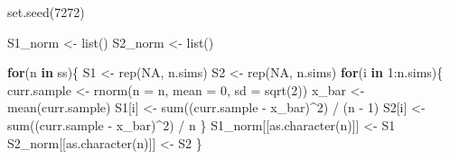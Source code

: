 \documentclass[
]{article}
\newenvironment{Shaded}{\begin{snugshade}}{\end{snugshade}}
\newcommand{\AttributeTok}[1]{\textcolor[rgb]{0.40,0.45,0.13}{#1}}
\newcommand{\ConstantTok}[1]{\textcolor[rgb]{0.56,0.35,0.01}{#1}}
\newcommand{\ControlFlowTok}[1]{\textcolor[rgb]{0.00,0.23,0.31}{\textbf{#1}}}
\newcommand{\DecValTok}[1]{\textcolor[rgb]{0.68,0.00,0.00}{#1}}
\newcommand{\FunctionTok}[1]{\textcolor[rgb]{0.28,0.35,0.67}{#1}}
\newcommand{\NormalTok}[1]{\textcolor[rgb]{0.00,0.23,0.31}{#1}}
\newcommand{\OtherTok}[1]{\textcolor[rgb]{0.00,0.23,0.31}{#1}}
\newcommand{\SpecialCharTok}[1]{\textcolor[rgb]{0.37,0.37,0.37}{#1}}
\begin{document}
\begin{Shaded}
\begin{Highlighting}[numbers=left,,]
\FunctionTok{set.seed}\NormalTok{(}\DecValTok{7272}\NormalTok{)}

\NormalTok{S1\_norm }\OtherTok{\textless{}{-}} \FunctionTok{list}\NormalTok{()}
\NormalTok{S2\_norm }\OtherTok{\textless{}{-}} \FunctionTok{list}\NormalTok{()}

\ControlFlowTok{for}\NormalTok{(n }\ControlFlowTok{in}\NormalTok{ ss)\{}
\NormalTok{  S1 }\OtherTok{\textless{}{-}} \FunctionTok{rep}\NormalTok{(}\ConstantTok{NA}\NormalTok{, n.sims)}
\NormalTok{  S2 }\OtherTok{\textless{}{-}} \FunctionTok{rep}\NormalTok{(}\ConstantTok{NA}\NormalTok{, n.sims)}
  \ControlFlowTok{for}\NormalTok{(i }\ControlFlowTok{in} \DecValTok{1}\SpecialCharTok{:}\NormalTok{n.sims)\{}
\NormalTok{    curr.sample }\OtherTok{\textless{}{-}} \FunctionTok{rnorm}\NormalTok{(}\AttributeTok{n =}\NormalTok{ n, }\AttributeTok{mean =} \DecValTok{0}\NormalTok{, }\AttributeTok{sd =} \FunctionTok{sqrt}\NormalTok{(}\DecValTok{2}\NormalTok{))}
\NormalTok{    x\_bar }\OtherTok{\textless{}{-}} \FunctionTok{mean}\NormalTok{(curr.sample)}
\NormalTok{    S1[i] }\OtherTok{\textless{}{-}} \FunctionTok{sum}\NormalTok{((curr.sample }\SpecialCharTok{{-}}\NormalTok{ x\_bar)}\SpecialCharTok{\^{}}\DecValTok{2}\NormalTok{) }\SpecialCharTok{/}\NormalTok{ (n }\SpecialCharTok{{-}} \DecValTok{1}\NormalTok{)}
\NormalTok{    S2[i] }\OtherTok{\textless{}{-}} \FunctionTok{sum}\NormalTok{((curr.sample }\SpecialCharTok{{-}}\NormalTok{ x\_bar)}\SpecialCharTok{\^{}}\DecValTok{2}\NormalTok{) }\SpecialCharTok{/}\NormalTok{ n}
\NormalTok{  \}}
\NormalTok{  S1\_norm[[}\FunctionTok{as.character}\NormalTok{(n)]] }\OtherTok{\textless{}{-}}\NormalTok{ S1}
\NormalTok{  S2\_norm[[}\FunctionTok{as.character}\NormalTok{(n)]] }\OtherTok{\textless{}{-}}\NormalTok{ S2}
\NormalTok{\}}


\end{Highlighting}
\end{Shaded}
\end{document}
